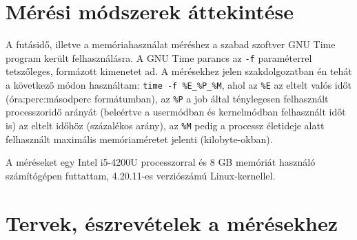 

\section{Mérési módszerek áttekintése}
A futásidő, illetve a memóriahasználat méréshez a szabad szoftver GNU Time program került felhasználásra. A GNU Time parancs az \lstinline{-f} paraméterrel tetszőleges, formázott kimenetet ad. A mérésekhez jelen szakdolgozatban én tehát a következő módon használtam: \lstinline{time -f %E_%P_%M}, ahol az \lstinline{%E} az eltelt valós időt (óra:perc:másodperc formátumban), az \lstinline{%P} a job által ténylegesen felhasznált processzoridő arányát (beleértve a usermódban és kernelmódban felhasznált időt is) az eltelt időhöz (százalékos arány), az \lstinline{%M} pedig a processz életideje alatt felhasznált maximális memóriaméretet jelenti (kilobyte-okban).

A méréseket egy Intel i5-4200U processzorral és 8 GB memóriát használó számítógépen futtattam, 4.20.11-es verziószámú Linux-kernellel.

\section{Tervek, észrevételek a mérésekhez}
